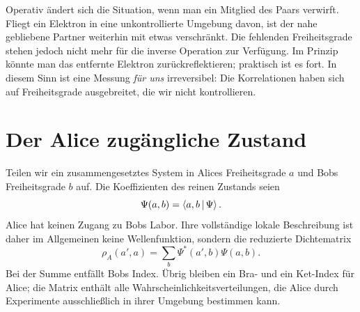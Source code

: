Operativ ändert sich die Situation, wenn man ein Mitglied des Paars verwirft. Fliegt ein Elektron in eine unkontrollierte Umgebung davon, ist der nahe gebliebene Partner weiterhin mit etwas verschränkt. Die fehlenden Freiheitsgrade stehen jedoch nicht mehr für die inverse Operation zur Verfügung. Im Prinzip könnte man das entfernte Elektron zurückreflektieren; praktisch ist es fort. In diesem Sinn ist eine Messung \emph{für uns} irreversibel: Die Korrelationen haben sich auf Freiheitsgrade ausgebreitet, die wir nicht kontrollieren.

\begin{classroomqa}
\end{classroomqa}

\begin{classroomqa}
\end{classroomqa}

\section{Der Alice zugängliche Zustand}

Teilen wir ein zusammengesetztes System in Alices Freiheitsgrade \(a\) und Bobs Freiheitsgrade \(b\) auf. Die Koeffizienten des reinen Zustands seien
\begin{equation}
\Psi(a,b)=\left\langle a,b\,\middle|\,\Psi\right\rangle.
\end{equation}
Alice hat keinen Zugang zu Bobs Labor. Ihre vollständige lokale Beschreibung ist daher im Allgemeinen keine Wellenfunktion, sondern die reduzierte Dichtematrix
\begin{equation}
\rho_A(a',a)
=
\sum_b \Psi^*(a',b)\Psi(a,b).
\label{eq:l8-reduced-density}
\end{equation}
Bei der Summe entfällt Bobs Index. Übrig bleiben ein Bra- und ein Ket-Index für Alice; die Matrix enthält alle Wahrscheinlichkeitsverteilungen, die Alice durch Experimente ausschließlich in ihrer Umgebung bestimmen kann.

